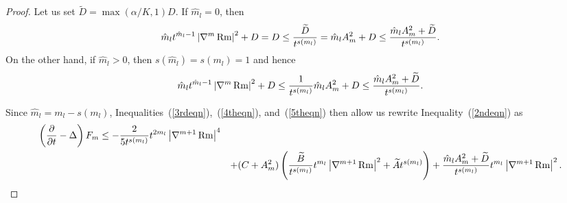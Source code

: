 \begin{proof}
Let us set $\widetilde D=\max(\alpha/K,1)D$. If $\hat m_l=0$, then
\begin{equation}\label{5theqn}
\hat m_lt^{\hat
m_l-1}\left\vert\nabla^m\operatorname{Rm}\right\vert^2+D =D\le
\frac{\widetilde D}{t^{s(m_l)}}=\hat m_lA_m^2+D\le \frac{\hat
m_lA_m^2+\widetilde D}{t^{s(m_l)}}.\end{equation}  On the other
hand, if $\hat m_l>0$, then $s(\hat m_l)=s(m_l)=1$ and hence
$$\hat m_lt^{\hat m_l-1}\left\vert\nabla^m\operatorname{Rm}\right\vert^2+D\le
\frac{1}{t^{s(m_l)}}\hat m_lA_m^2+D\le \frac{\hat
m_lA_m^2+\widetilde D}{t^{s(m_l)}}.$$


Since $\hat m_l =m_l-s(m_l)$,
Inequalities~(\ref{3rdeqn}),~(\ref{4theqn}), and~(\ref{5theqn}) then
allow us  rewrite Inequality~(\ref{2ndeqn}) as
\begin{eqnarray*}
\left(  \frac{\partial}{\partial t}-\Delta\right)F_m
 \leq   -\frac{2}{5t^{s( m_l)  }
 }t^{2m_l}\left\vert\nabla^{m+1}\operatorname{Rm}\right\vert^4\\
& &  +(C+A_m^2)\left(\frac{\widetilde B}{t^{s(m_l)}}
t^{m_l}\left\vert\nabla^{m+1}\operatorname{Rm}\right\vert^2+\widetilde
At^{s(m_l)}\right) +\frac{\hat m_lA_m^2+\widetilde
D}{t^{s(m_l)}}t^{m_l}\left\vert\nabla^{m+1}\operatorname{Rm}
\right\vert^2.
\end{eqnarray*}


\end{proof}
